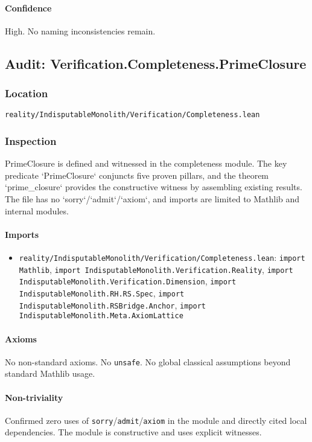 \documentclass{article}
\newcommand{\FileRef}[1]{\texttt{#1}}
\begin{document}
\paragraph{Confidence} High. No naming inconsistencies remain.

\subsection{Audit: Verification.Completeness.PrimeClosure}
\subsubsection{Location}
\FileRef{reality/IndisputableMonolith/Verification/Completeness.lean}

\subsubsection{Inspection}
PrimeClosure is defined and witnessed in the completeness module. The key predicate `PrimeClosure` conjuncts five proven pillars, and the theorem `prime\_closure` provides the constructive witness by assembling existing results. The file has no `sorry`/`admit`/`axiom`, and imports are limited to Mathlib and internal modules.

\paragraph{Imports}
\begin{itemize}[leftmargin=*]
  \item \FileRef{reality/IndisputableMonolith/Verification/Completeness.lean}: \texttt{import Mathlib}, \texttt{import IndisputableMonolith.Verification.Reality}, \texttt{import IndisputableMonolith.Verification.Dimension}, \texttt{import IndisputableMonolith.RH.RS.Spec}, \texttt{import IndisputableMonolith.RSBridge.Anchor}, \texttt{import IndisputableMonolith.Meta.AxiomLattice}
\end{itemize}

\paragraph{Axioms}
No non-standard axioms. No \texttt{unsafe}. No global classical assumptions beyond standard Mathlib usage.

\paragraph{Non-triviality}
Confirmed zero uses of \texttt{sorry}/\texttt{admit}/\texttt{axiom} in the module and directly cited local dependencies. The module is constructive and uses explicit witnesses.
\end{document}
